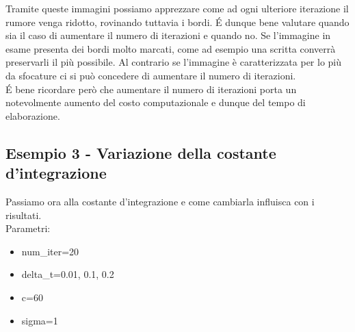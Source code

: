 Tramite queste immagini possiamo apprezzare come ad ogni ulteriore iterazione il rumore venga ridotto, rovinando tuttavia i bordi. \'E dunque bene valutare quando sia il caso di aumentare il numero di iterazioni e quando no. Se l'immagine in esame presenta dei bordi molto marcati, come ad esempio una scritta converrà preservarli il più possibile. Al contrario se l'immagine è caratterizzata per lo più da sfocature ci si può concedere di aumentare il numero di iterazioni.\\
\'E bene ricordare però che aumentare il numero di iterazioni porta un notevolmente aumento del costo computazionale e dunque del tempo di elaborazione.

\newpage
\subsection{Esempio 3 - Variazione della costante d'integrazione}
Passiamo ora alla costante d'integrazione e come cambiarla influisca con i risultati.\\
Parametri:
\begin{itemize}
    \item num\_iter=20
    \item delta\_t=0.01, 0.1, 0.2
    \item c=60
    \item sigma=1
\end{itemize}

